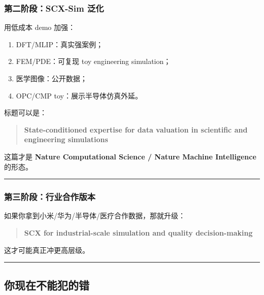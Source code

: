 \documentclass[
  12pt,
]{ctexart}
\providecommand{\tightlist}{%
  \setlength{\itemsep}{0pt}\setlength{\parskip}{0pt}}
\begin{document}
\subsubsection{第二阶段：SCX-Sim
泛化}\label{ux7b2cux4e8cux9636ux6bb5scx-sim-ux6cdbux5316}

用低成本 demo 加强：

\begin{enumerate}
\def\labelenumi{\arabic{enumi}.}
\tightlist
\item
  DFT/MLIP：真实强案例；
\item
  FEM/PDE：可复现 toy engineering simulation；
\item
  医学图像：公开数据；
\item
  OPC/CMP toy：展示半导体仿真外延。
\end{enumerate}

标题可以是：

\begin{quote}
\textbf{State-conditioned expertise for data valuation in scientific and
engineering simulations}
\end{quote}

这篇才是 \textbf{Nature Computational Science / Nature Machine
Intelligence} 的形态。

\begin{center}\rule{0.5\linewidth}{0.5pt}\end{center}

\subsubsection{第三阶段：行业合作版本}\label{ux7b2cux4e09ux9636ux6bb5ux884cux4e1aux5408ux4f5cux7248ux672c}

如果你拿到小米/华为/半导体/医疗合作数据，那就升级：

\begin{quote}
\textbf{SCX for industrial-scale simulation and quality decision-making}
\end{quote}

这才可能真正冲更高层级。

\begin{center}\rule{0.5\linewidth}{0.5pt}\end{center}

\subsection{你现在不能犯的错}\label{ux4f60ux73b0ux5728ux4e0dux80fdux72afux7684ux9519}
\end{document}
